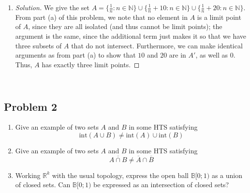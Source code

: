 \documentclass{article}
\newcommand{\N}{{\mathbb N}}
\newcommand{\R}{{\mathbb R}}
\begin{document}
\begin{enumerate}
\begin{proof}[Solution]
		Now, note that $0 \in A'$ so $A' \neq \emptyset$.
		If $U$ is be an arbitrary open set in the neighbourhood of $0$.
		Note that we will always have an element of $A$ in $U$.
		Assume otherwise, that there exists an open set $U$ such that
		$U \cap A = \emptyset$.
		Conside a ball in $U$, specifically $\mathbb{B}[0,r) \subseteq U$.
		Note by the Archimedean property of the reals,
		there exists $n \in \N$ such that $n\cdot1 > r^{-1} > 0$,
		thus $0 < \frac{1}{n} < r$.
		But then $\frac{1}{n} \in \mathbb{B}[0,r)$,
		thus a contradiction.
		Thus, since $U \in \mathcal{N}(0)$ was arbitrary,
		we have that every open set in the neighbourhood of $0$
		has a non empty intersection with $A$,
		thus $0$ is a limit piont of $A$.
		Thus, $A' \neq \emptyset$.
	\end{proof}
	\item \begin{proof}[Solution]\let\qed\relax
		We give the set $A = \{\frac{1}{n} \colon n \in \N\}
		\cup \{\frac{1}{n} + 10 \colon n \in \N\}
		\cup \{\frac{1}{n} + 20 \colon n \in \N\}$.
		From part (a) of this problem,
		we note that no element in $A$ is a limit point of $A$,
		since they are all isolated (and thus cannot be limit points);
		the argument is the same, since the additional term
		just makes it so that we have three subsets of $A$
		that do not intersect.
		Furthermore, we can make identical arguments as from part (a)
		to show that $10$ and $20$ are in $A'$,
		as well as $0$.
		Thus, $A$ has exactly three limit points.
	\end{proof}
\end{enumerate}
\clearpage
~\clearpage

\subsection*{Problem 2}
{\it \begin{enumerate}
	\item Give an example of two sets $A$ and $B$ in some HTS satisfying
		\[
			\mathrm{int}(A\cup B) \neq \mathrm{int}(A)\cup\mathrm{int}(B)
		\]
	\item Give an example of two sets $A$ and $B$ in some HTS satisfying
		\[
			\overline{A\cap B} \neq \overline{A} \cap \overline{B}
		\]
	\item Working $\R^k$ with the usual topology, express the open ball
		$\mathbb{B}[0;1)$ as a union of closed sets.
		Can $\mathbb{B}[0;1)$ be expressed as an intersection of closed sets?
\end{enumerate}}
\end{document}

